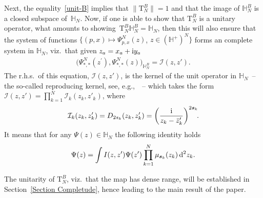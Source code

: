 \documentclass[pdftex]{sigma}%
\numberwithin{equation}{section}
\begin{document}
Next, the equality~\eqref{unit-B} implies that $\|\mathrm T_{N}^{B}\|=1$ and that the image of $\mathbb H_{N}^{B}$ is a closed subspace of~$\mathbb H_N$. Now, if one is able to show that $\mathrm T_{N}^{B}$ is a unitary operator, what amounts to sho\-wing~$\mathrm T_{N}^{B}\mathbb H_{N}^{B}=\mathbb H_N$, then this will also ensure that the system of functions $\big\{(p,x)\mapsto \Psi^{N}_{p,{x}}(z)$, $z\in (\mathbb{H}^+)^{N}\big\}$ forms an complete system in $\mathbb H_N$, viz.~that given $z_a=x_a+{\rm i}y_a$
\begin{gather*}
\big(\Psi^N_{*,*}(z^{\prime} ), \Psi^N_{*,*}(z)\big)_{ \mathbb{H}_N^{B} } = \mathcal{I}(z,z').
\end{gather*}
The r.h.s.\ of this equation, $\mathcal I(z,z')$, is the kernel of the unit operator in $\mathbb H_N$~-- the so-called reproducing kernel,
see, e.g.,~\cite{HallBrian}~-- which takes the form $\mathcal I(z,z')=\prod_{k=1}^N \mathcal I_k(z_k,z'_k)$, where
\begin{gather*}
\mathcal I_k(z_k,z'_k)=D_{2s_k}(z_k,z'_k)=\bigg(\frac{\rm i}{z_k-\bar z'_k}\bigg)^{2\boldsymbol s_k}\!.
\end{gather*}
It means that for any $\Psi(z)\in \mathbb H_N$ the following identity holds
\begin{gather*}
\Psi(z)=\int I(z,z')\Psi(z')\prod_{k=1}^N \mu_{\boldsymbol s_k}(z_k)\,{\rm d}^2z_k.
\end{gather*}

The unitarity of $\mathrm T_{N}^{B}$, viz.~that the map has dense range, will be established in Section~\ref{Section Completude},
hence leading to the main result of the paper.
\end{document}
